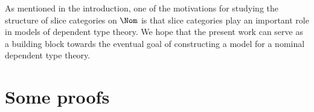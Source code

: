 \documentclass[twoside,11pt]{entics}
\begin{document}
As mentioned in the introduction, one of the motivations for studying
the structure of slice categories on $\Nom$ is that slice categories
play an important role in models of dependent type theory. We hope
that the present work can serve as a building block towards the
eventual goal of constructing a model for a nominal dependent type
theory. 





\appendix

\section{Some proofs}\label{app:proofs}
\end{document}
